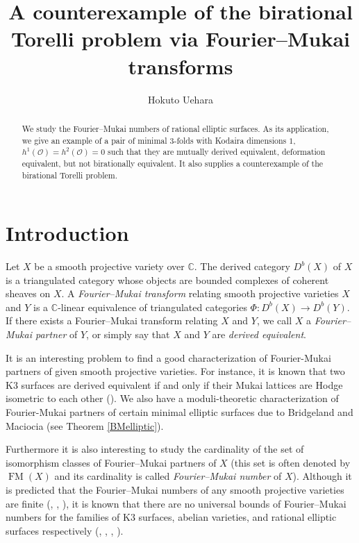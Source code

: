 \documentclass[a4paper,11pt]{article}
\title{A counterexample of 
the birational Torelli problem via Fourier--Mukai transforms}
\author{Hokuto Uehara}
\date{}
\theoremstyle{definition}\newtheorem{defn}[thm]{Definition}
\theoremstyle{remark}\newtheorem{remark}[thm]{Remark}
\numberwithin{equation}{section}
\newcommand{\FM}{\operatorname{FM}}
\newcommand{\mc}{\mathcal}
\newcommand{\C}{\mathbb C}
\begin{document}
\maketitle

\begin{abstract}
We study the Fourier--Mukai numbers of rational elliptic 
surfaces. As its application, we give an example of 
a pair of minimal  $3$-folds with 
Kodaira dimensions $1$, $h^1(\mc O)=h^2(\mc O)=0$ such that
they are mutually derived equivalent, deformation equivalent,
but not birationally equivalent. It also supplies a counterexample of 
the birational Torelli problem.  
\end{abstract}


 \section{Introduction}\label{section:introduction}


Let $X$ be a smooth projective variety over $\C$. The derived category $D^b(X)$ of $X$ is a triangulated category
whose objects are bounded complexes of coherent sheaves on $X$.
A \emph{Fourier--Mukai transform} relating smooth projective varieties 
$X$ and $Y$ is a $\C$-linear equivalence
of triangulated categories $\Phi: D^b(X)\to D^b(Y)$.
If there exists a Fourier--Mukai 
transform relating $X$ and $Y$, we call $X$ a
\emph{Fourier--Mukai partner} of $Y$, or simply say 
that $X$ and $Y$ are 
\emph{derived equivalent}.

It is an interesting problem to find a good characterization of  
Fourier-Mukai partners of given smooth projective varieties. 
For instance, it is known that 
two K$3$ surfaces are derived equivalent 
if and only if their Mukai lattices are Hodge isometric to each other 
(\cite{Or96}). We also have a moduli-theoretic characterization of  
Fourier-Mukai partners of certain minimal elliptic surfaces
due to Bridgeland and Maciocia
(see Theorem \ref{BMelliptic}).

 Furthermore it is also interesting to study the cardinality
 of the set of  
 isomorphism classes of Fourier--Mukai partners of $X$ (this set is often denoted by 
 $\FM (X)$ and its cardinality is called \emph{Fourier--Mukai number} of $X$).
 Although it is predicted that the Fourier--Mukai numbers of 
any smooth projective varieties are finite 
(\cite{BM01}, \cite{Ka02}, \cite{To06}),
it is known that there are no universal bounds of Fourier--Mukai numbers 
for the
families of K$3$ surfaces, abelian varieties, and rational  elliptic 
surfaces respectively
(\cite{Og02}, \cite{Or02}, \cite{HLOY03}, \cite{Ue04}). 
\end{document}
